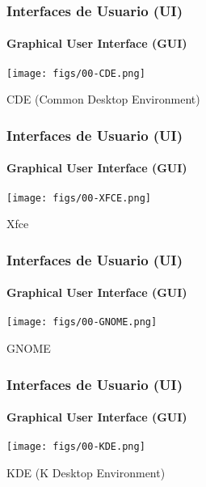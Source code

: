 \documentclass[letter]{beamer}
\begin{document}
\begin{frame}
  \frametitle{Interfaces de Usuario (UI)}
  \framesubtitle{Graphical User Interface (GUI)}

  \begin{center}
    \texttt{[image: figs/00-CDE.png]}
  
    CDE (Common Desktop Environment)
  \end{center}

\end{frame}

\begin{frame}
  \frametitle{Interfaces de Usuario (UI)}
  \framesubtitle{Graphical User Interface (GUI)}

  \begin{center}
    \texttt{[image: figs/00-XFCE.png]}
  
    Xfce
  \end{center}

\end{frame}

\begin{frame}
  \frametitle{Interfaces de Usuario (UI)}
  \framesubtitle{Graphical User Interface (GUI)}

  \begin{center}
    \texttt{[image: figs/00-GNOME.png]}
  
    GNOME 
  \end{center}

\end{frame}

\begin{frame}
  \frametitle{Interfaces de Usuario (UI)}
  \framesubtitle{Graphical User Interface (GUI)}

  \begin{center}
    \texttt{[image: figs/00-KDE.png]}
  
    KDE (K Desktop Environment)
  \end{center}

\end{frame}

\end{document}
